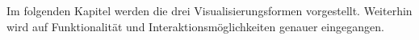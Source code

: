 \documentclass[usegeometry=true]{scrartcl}
\begin{document}
Im folgenden Kapitel werden die drei Visualisierungsformen vorgestellt. Weiterhin wird auf Funktionalität und Interaktionsmöglichkeiten genauer eingegangen.


\end{document}
